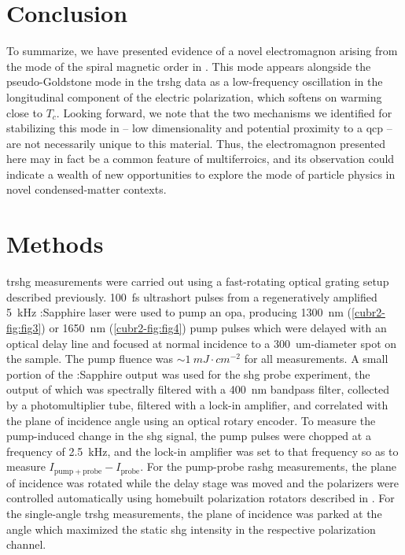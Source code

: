 \section{Conclusion}
To summarize, we have presented evidence of a novel electromagnon arising from the \higgs mode of the spiral magnetic order in .
This mode appears alongside the pseudo-Goldstone mode in the \gls{trshg} data as a low-frequency oscillation in the longitudinal component of the electric polarization, which softens on warming close to $T_c$.
Looking forward, we note that the two mechanisms we identified for stabilizing this mode in  -- low dimensionality and potential proximity to a \gls{qcp} -- are not necessarily unique to this material.
Thus, the \higgs electromagnon presented here may in fact be a common feature of \oned multiferroics, and its observation could indicate a wealth of new opportunities to explore the \higgs mode of particle physics in novel condensed-matter contexts.

\section{Methods}\label{cubr2-sec:methods}
\Gls{trshg} measurements were carried out using a fast-rotating optical grating setup described previously\citep{fichera_second_2020,harter_high-speed_2015,torchinsky_low_2014}.
\qty{100}{fs} ultrashort pulses from a regeneratively amplified \qty{5}{kHz} :Sapphire laser were used to pump an \gls{opa}, producing \qty{1300}{nm} (\cref{cubr2-fig:fig3}) or \qty{1650}{nm} (\cref{cubr2-fig:fig4}) pump pulses which were delayed with an optical delay line and focused at normal incidence to a \qty{300}{um}-diameter spot on the sample.
The pump fluence was $\sim \qty{1}{mJ\cdot cm^{-2}}$ for all measurements.
A small portion of the :Sapphire output was used for the \gls{shg} probe experiment, the output of which was spectrally filtered with a \qty{400}{nm} bandpass filter, collected by a photomultiplier tube, filtered with a lock-in amplifier, and correlated with the plane of incidence angle using an optical rotary encoder.
To measure the pump-induced change in the \gls{shg} signal, the pump pulses were chopped at a frequency of \qty{2.5}{kHz}, and the lock-in amplifier was set to that frequency so as to measure $I_{\mathrm{pump}+\mathrm{probe}}-I_\mathrm{probe}$.
For the pump-probe \gls{rashg} measurements, the plane of incidence was rotated while the delay stage was moved and the polarizers were controlled automatically using homebuilt polarization rotators described in \citet{morey_automated_2024}.
For the single-angle \gls{trshg} measurements, the plane of incidence was parked at the angle which maximized the static \gls{shg} intensity in the respective polarization channel.


